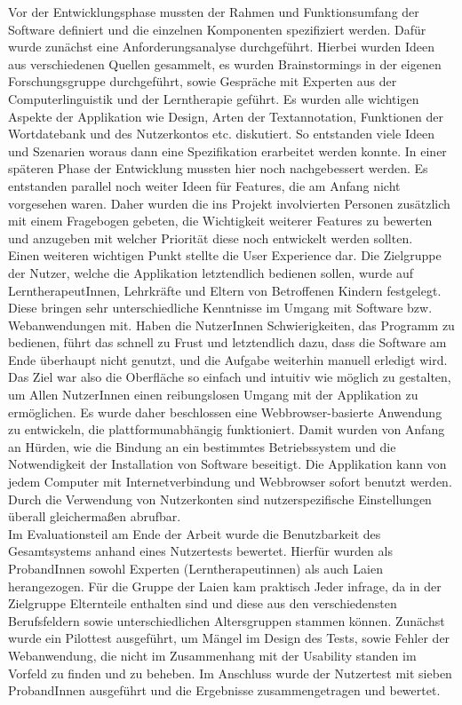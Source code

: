 Vor der Entwicklungsphase mussten der Rahmen und Funktionsumfang der Software definiert und die einzelnen Komponenten spezifiziert werden. Dafür wurde zunächst eine Anforderungsanalyse durchgeführt. Hierbei wurden Ideen aus verschiedenen Quellen gesammelt, es wurden Brainstormings in der eigenen Forschungsgruppe durchgeführt, sowie Gespräche mit Experten aus der Computerlinguistik und der Lerntherapie geführt. Es wurden alle wichtigen Aspekte der Applikation wie Design, Arten der Textannotation, Funktionen der Wortdatebank und des Nutzerkontos etc. diskutiert. So entstanden viele Ideen und Szenarien woraus dann eine Spezifikation erarbeitet werden konnte. In einer späteren Phase der Entwicklung mussten hier noch nachgebessert werden. Es entstanden parallel noch weiter Ideen für Features, die am Anfang nicht vorgesehen waren. Daher wurden die ins Projekt involvierten Personen zusätzlich mit einem Fragebogen gebeten, die Wichtigkeit weiterer Features zu bewerten und anzugeben mit welcher Priorität diese noch entwickelt werden sollten.\\

Einen weiteren wichtigen Punkt stellte die User Experience dar. Die Zielgruppe der Nutzer, welche die Applikation letztendlich bedienen sollen, wurde auf LerntherapeutInnen, Lehrkräfte und Eltern von Betroffenen Kindern festgelegt. Diese bringen sehr unterschiedliche Kenntnisse im Umgang mit Software bzw. Webanwendungen mit. Haben die NutzerInnen Schwierigkeiten, das Programm zu bedienen, führt das schnell zu Frust und letztendlich dazu, dass die Software am Ende überhaupt nicht genutzt, und die Aufgabe weiterhin manuell erledigt wird.  Das Ziel war also die Oberfläche so einfach und intuitiv wie möglich zu gestalten, um Allen NutzerInnen einen reibungslosen Umgang mit der Applikation zu ermöglichen. Es wurde daher beschlossen eine Webbrowser-basierte Anwendung zu entwickeln, die plattformunabhängig funktioniert. Damit wurden von Anfang an Hürden, wie die Bindung an ein bestimmtes Betriebssystem und die Notwendigkeit der Installation von Software beseitigt. Die Applikation kann von jedem Computer mit Internetverbindung und Webbrowser sofort benutzt werden. Durch die Verwendung von Nutzerkonten sind nutzerspezifische Einstellungen überall gleichermaßen abrufbar.\\

Im Evaluationsteil am Ende der Arbeit wurde die Benutzbarkeit des Gesamtsystems anhand eines Nutzertests bewertet. Hierfür wurden als ProbandInnen sowohl Experten (Lerntherapeutinnen) als auch Laien herangezogen. Für die Gruppe der Laien kam praktisch Jeder infrage, da in der Zielgruppe Elternteile enthalten sind und diese aus den verschiedensten Berufsfeldern sowie unterschiedlichen Altersgruppen stammen können. Zunächst wurde ein Pilottest ausgeführt, um Mängel im Design des Tests, sowie Fehler der Webanwendung, die nicht im Zusammenhang mit der Usability standen im Vorfeld zu finden und zu beheben. Im Anschluss wurde der Nutzertest mit sieben ProbandInnen ausgeführt und die Ergebnisse zusammengetragen und bewertet.\\

